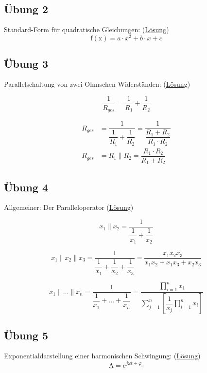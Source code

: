 \documentclass[11pt, oneside, a4paper, titlepage, ngerman]{scrreprt}
\newcommand{\sol}{Lösung}
\begin{document}
\subsection{Übung 2}
\label{sub:math2}
Standard-Form für quadratische Gleichungen: (\hyperref[sub:math2_sol]{\sol}) {\large
\begin{equation}
	\mathrm{ f(x) } = a \cdot x^2 + b \cdot x + c
\end{equation} }


\subsection{Übung 3}
\label{sub:math3}
Parallelschaltung von zwei Ohmschen Widerständen: (\hyperref[sub:math3_sol]{\sol}) {\large
\begin{equation} 
	\dfrac{1}{R_{ges}} = \dfrac{1}{R_1} + \dfrac{1}{R_2}
\end{equation}

\begin{align}
	R_{ges} &= \dfrac{1}{ \dfrac{1}{R_1} + \dfrac{1}{R_2} } = \dfrac{1}{ \dfrac{R_1 + R_2}{R_1 \cdot R_2} } \\
	R_{ges} &= R_1 \parallel R_2 = \dfrac{R_1 \cdot R_2}{R_1 + R_2}
\end{align} }


\subsection{Übung 4}
\label{sub:math4}
Allgemeiner: Der Paralleloperator (\hyperref[sub:math4_sol]{\sol}) {\large
\begin{equation}
	x_1 \parallel x_2 = \dfrac{1}{ \dfrac{1}{x_1} + \dfrac{1}{x_2} }
\end{equation} 

\begin{equation}
	x_1 \parallel x_2 \parallel x_3 = \dfrac{1}{ \dfrac{1}{x_1} + \dfrac{1}{x_2} + \dfrac{1}{x_3}}
	= \dfrac{x_1 x_2 x_3}{x_1 x_2 + x_1 x_3 + x_2 x_3}
\end{equation} 

\begin{equation}
	x_1 \parallel \dots \parallel x_n = \dfrac{1}{ \dfrac{1}{x_1} + \dots + \dfrac{1}{x_n}}
	= \dfrac{ \prod \limits _{i=1} ^{n} x_i}{ \sum \limits _{j=1} ^{n} \left[ \dfrac{1}{x_j} \prod \limits _{i=1} ^{n} x_i \right] } 
\end{equation} }

\subsection{Übung 5}
\label{sub:math5}
Exponentialdarstellung einer harmonischen Schwingung: (\hyperref[sub:math5_sol]{\sol}) {\large
\begin{equation}
	\mathrm{ \underline{A} } = e^{j \omega t + \varphi_0}
\end{equation} }
\end{document}
